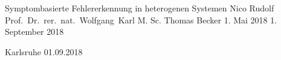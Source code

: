 \documentclass[a4paper,titlepage,12pt,twoside,openright,abstracton,headsepline,halfparskip,final,BCOR1.0cm]{scrreprt}
\begin{document}
	


	\pagestyle{empty}

			{Symptombasierte Fehlererkennung in heterogenen Systemen}  %
			{Nico Rudolf}                %
			{Prof.~Dr.~rer.~nat.~Wolfgang~Karl}
			{M. Sc. Thomas Becker} %
			{1. Mai 2018}                               %
			{1. September 2018}                                 %

			{Karlsruhe}    %
			{01.09.2018}    %

	\cleardoublepage
	
% 	
	
	\cleardoublepage

	\pagestyle{scrheadings}

	\tableofcontents
	\listoftables
	\listoffigures
	

	
	
	\cleardoublepage

	\pagestyle{scrheadings}
     

	
	
	
	
	
	
%	


% 	


	

%  


	
\end{document}
